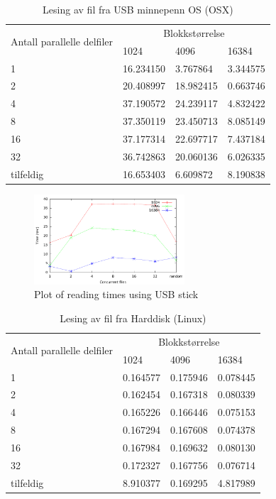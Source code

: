 \documentclass[titlepage]{article}
\begin{document}
\begin{table}[h!]
\caption{Lesing av fil fra USB minnepenn OS (OSX)}
\label{USB}
\centering
\begin{tabular}{|l|l|l|l|}
\hline
\multirow{2}{*}{ Antall parallelle delfiler} & \multicolumn{3}{|c|}{Blokkstørrelse} \\
 & 1024 & 4096 & 16384\\
\hline
1         &  16.234150 &   3.767864 &  3.344575 \\
2         &  20.408997 &  18.982415 &  0.663746 \\
4         &  37.190572 &  24.239117 &  4.832422 \\
8         &  37.350119 &  23.450713 &  8.085149 \\
16        &  37.177314 &  22.697717 &  7.437184 \\
32        &  36.742863 &  20.060136 &  6.026335 \\
tilfeldig &  16.653403 &   6.609872 &  8.190838 \\
\hline
\end{tabular}
\end{table}

\begin{figure}[h!]
  \caption{Plot of reading times using USB stick}
  \label{fig:usb}
  \centering
  \includegraphics[width=0.5\textwidth]{res/result-usb}
\end{figure}

\begin{table}[h!]
\caption{Lesing av fil fra Harddisk (Linux)}
\label{HDD}
\centering
\begin{tabular}{|l|l|l|l|}
\hline
\multirow{2}{*}{ Antall parallelle delfiler} & \multicolumn{3}{|c|}{Blokkstørrelse} \\
 & 1024 & 4096 & 16384\\
\hline
1         &  0.164577 &  0.175946 & 0.078445 \\
2         &  0.162454 &  0.167318 & 0.080339 \\
4         &  0.165226 &  0.166446 & 0.075153 \\
8         &  0.167294 &  0.167608 & 0.074378 \\
16        &  0.167984 &  0.169632 & 0.080130 \\
32        &  0.172327 &  0.167756 & 0.076714 \\
tilfeldig &  8.910377 &  0.169295 & 4.817989 \\
\hline
\end{tabular}
\end{table}
\end{document}
